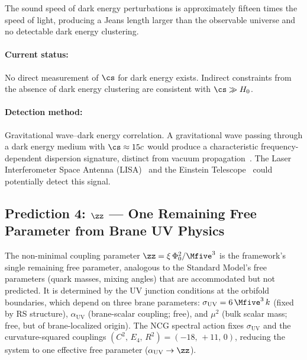 The sound speed of dark energy perturbations is approximately fifteen times the speed of light, producing a Jeans length larger than the observable universe and no detectable dark energy clustering.

\paragraph{Current status:} No direct measurement of $\cs$ for dark energy exists. Indirect constraints from the absence of dark energy clustering are consistent with $\cs \gg H_0$.

\paragraph{Detection method:} Gravitational wave--dark energy correlation. A gravitational wave passing through a dark energy medium with $\cs \approx 15c$ would produce a characteristic frequency-dependent dispersion signature, distinct from vacuum propagation~\cite{ch1:amendola18}. The Laser Interferometer Space Antenna (LISA)~\cite{ch1:lisa} and the Einstein Telescope~\cite{ch1:einstein-telescope} could potentially detect this signal.

\subsection{Prediction 4: \texorpdfstring{$\zz$}{zeta0} --- One Remaining Free Parameter from Brane UV Physics}
\label{sec:1-pred4}

The non-minimal coupling parameter $\zz = \xi\,\Phi_0^2/\Mfive^3$ is the framework's single remaining free parameter, analogous to the Standard Model's free parameters (quark masses, mixing angles) that are accommodated but not predicted. It is determined by the UV junction conditions at the orbifold boundaries, which depend on three brane parameters: $\sigma_\mathrm{UV} = 6\,\Mfive^3\,k$ (fixed by RS structure), $\alpha_\mathrm{UV}$ (brane-scalar coupling; free), and $\mu^2$ (bulk scalar mass; free, but of brane-localized origin). The NCG spectral action fixes $\sigma_\mathrm{UV}$ and the curvature-squared couplings $(C^2,\,E_4,\,R^2) = (-18,\,+11,\,0)$, reducing the system to one effective free parameter ($\alpha_\mathrm{UV} \to \zz$).

